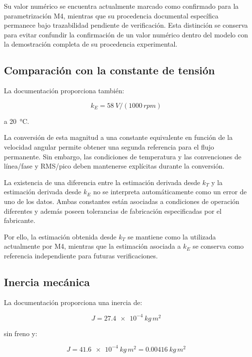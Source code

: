 Su valor numérico se encuentra actualmente marcado como confirmado para la parametrización M4, mientras que su procedencia documental específica permanece bajo trazabilidad pendiente de verificación. Esta distinción se conserva para evitar confundir la confirmación de un valor numérico dentro del modelo con la demostración completa de su procedencia experimental.

\subsection{Comparación con la constante de tensión}

La documentación proporciona también:

\begin{equation}
k_E=\SI{58}{V/(1000\,rpm)}
\end{equation}

a \SI{20}{\celsius}.

La conversión de esta magnitud a una constante equivalente en función de la velocidad angular permite obtener una segunda referencia para el flujo permanente. Sin embargo, las condiciones de temperatura y las convenciones de línea/fase y RMS/pico deben mantenerse explícitas durante la conversión.

La existencia de una diferencia entre la estimación derivada desde $k_T$ y la estimación derivada desde $k_E$ no se interpreta automáticamente como un error de uno de los datos. Ambas constantes están asociadas a condiciones de operación diferentes y además poseen tolerancias de fabricación especificadas por el fabricante.

Por ello, la estimación obtenida desde $k_T$ se mantiene como la utilizada actualmente por M4, mientras que la estimación asociada a $k_E$ se conserva como referencia independiente para futuras verificaciones.

\subsection{Inercia mecánica}

La documentación proporciona una inercia de:

\begin{equation}
J=\SI{27.4e-4}{kg\,m^2}
\end{equation}

sin freno y:

\begin{equation}
J=\SI{41.6e-4}{kg\,m^2}
=\SI{0.00416}{kg\,m^2}
\end{equation}

